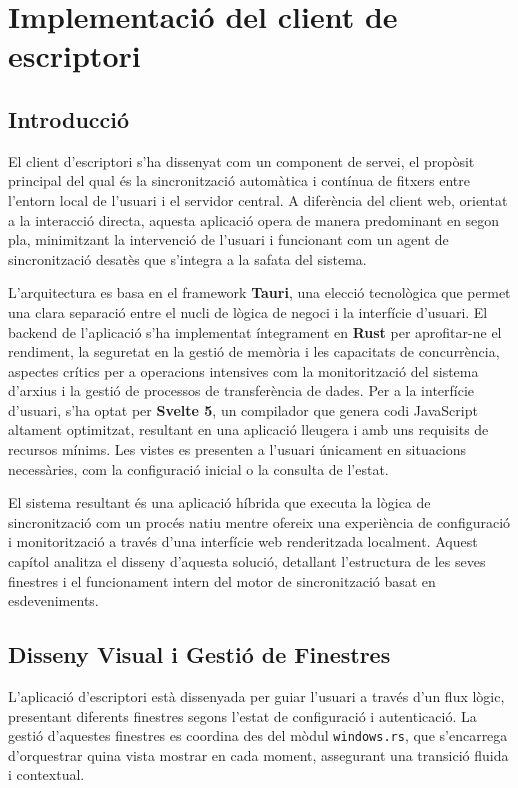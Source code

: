 
\section{Implementació del client de escriptori}

\subsection{Introducció}
El client d'escriptori s'ha dissenyat com un component de servei, el propòsit principal del qual és la sincronització automàtica i contínua de fitxers entre l'entorn local de l'usuari i el servidor central. A diferència del client web, orientat a la interacció directa, aquesta aplicació opera de manera predominant en segon pla, minimitzant la intervenció de l'usuari i funcionant com un agent de sincronització desatès que s'integra a la safata del sistema.

L'arquitectura es basa en el framework \textbf{Tauri}, una elecció tecnològica que permet una clara separació entre el nucli de lògica de negoci i la interfície d'usuari. El backend de l'aplicació s'ha implementat íntegrament en \textbf{Rust} per aprofitar-ne el rendiment, la seguretat en la gestió de memòria i les capacitats de concurrència, aspectes crítics per a operacions intensives com la monitorització del sistema d'arxius i la gestió de processos de transferència de dades. Per a la interfície d'usuari, s'ha optat per \textbf{Svelte 5}, un compilador que genera codi JavaScript altament optimitzat, resultant en una aplicació lleugera i amb uns requisits de recursos mínims. Les vistes es presenten a l'usuari únicament en situacions necessàries, com la configuració inicial o la consulta de l'estat.

El sistema resultant és una aplicació híbrida que executa la lògica de sincronització com un procés natiu mentre ofereix una experiència de configuració i monitorització a través d'una interfície web renderitzada localment. Aquest capítol analitza el disseny d'aquesta solució, detallant l'estructura de les seves finestres i el funcionament intern del motor de sincronització basat en esdeveniments.

\subsection{Disseny Visual i Gestió de Finestres}
L'aplicació d'escriptori està dissenyada per guiar l'usuari a través d'un flux lògic, presentant diferents finestres segons l'estat de configuració i autenticació. La gestió d'aquestes finestres es coordina des del mòdul \texttt{windows.rs}, que s'encarrega d'orquestrar quina vista mostrar en cada moment, assegurant una transició fluida i contextual.

